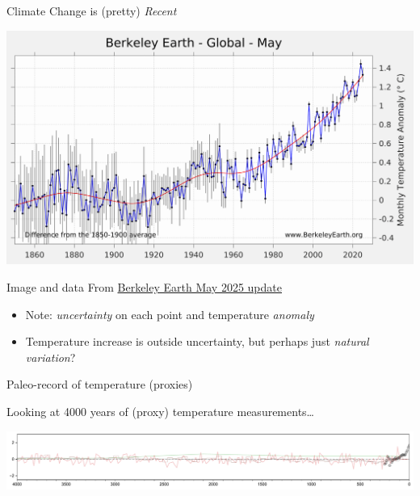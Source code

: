 \documentclass[12pt]{beamer}
\begin{document}
\begin{frame}{Climate Change is (pretty) {\em Recent}}


\begin{center}
\includegraphics[width=\textwidth]{images/global-avg-temperature-1860-present_may-2025-report_BEST}
\end{center}
\vspace{-0.5cm}
\hfill{\tiny Image and data From \href{https://berkeleyearth.org/may-2025-temperature-update/}{Berkeley Earth May 2025 update}}

{\small
\begin{itemize}
\item Note: {\em uncertainty} on each point and temperature {\em anomaly}
\item Temperature increase is outside uncertainty, but perhaps just {\em natural variation}?
\end{itemize}
}
\end{frame}
\begin{frame}{Paleo-record of temperature (proxies)}

Looking at 4000 years of (proxy) temperature measurements\ldots

\vspace{1cm}

 \includegraphics[width=1.05\textwidth]{images/row4_4kya}


\end{frame}
\end{document}
